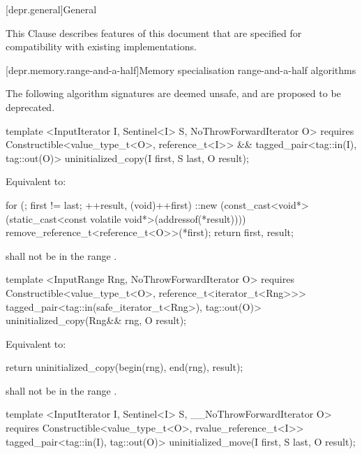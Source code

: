 
[depr.general]{General}

\pnum
This Clause describes features of this document that are specified for compatibility with existing
implementations.

[depr.memory.range-and-a-half]{Memory specialisation range-and-a-half algorithms}
{\color{addclr}
\pnum
The following algorithm signatures are deemed unsafe, and are proposed to be deprecated.

\begin{codeblock}
template <InputIterator I, Sentinel<I> S, NoThrowForwardIterator O>
requires
  Constructible<value_type_t<O>, reference_t<I>> &&
tagged_pair<tag::in(I), tag::out(O)>
  uninitialized_copy(I first, S last, O result);
\end{codeblock}

\pnum
\effects Equivalent to:
\begin{codeblock}
    for (; first != last; ++result, (void)++first) {
      ::new (const_cast<void*>(static_cast<const volatile void*>(addressof(*result))))
        remove_reference_t<reference_t<O>>(*first);
    }
    return {first, result};
\end{codeblock}

\requires {} shall not be in the range .

\begin{codeblock}
template <InputRange Rng, NoThrowForwardIterator O>
  requires
Constructible<value_type_t<O>, reference_t<iterator_t<Rng>>>
  tagged_pair<tag::in(safe_iterator_t<Rng>), tag::out(O)>
uninitialized_copy(Rng&& rng, O result);
\end{codeblock}

\pnum
\effects Equivalent to:
\begin{codeblock}
   return uninitialized_copy(begin(rng), end(rng), result);
\end{codeblock}

\pnum
\requires {} shall not be in the range .

\begin{codeblock}
template <InputIterator I, Sentinel<I> S, __NoThrowForwardIterator O>
  requires
Constructible<value_type_t<O>, rvalue_reference_t<I>>
  tagged_pair<tag::in(I), tag::out(O)>
uninitialized_move(I first, S last, O result);
\end{codeblock}

}
